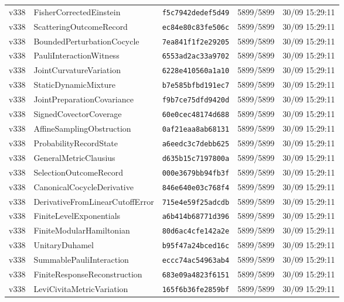 \documentclass[11pt]{article}
\theoremstyle{definition}\newtheorem{deriv}{Derivação}
\begin{document}
{\begin{longtable}{@{}lllll@{}}
v338 & FisherCorrectedEinstein & \texttt{f5c7942dedef5d49} & 5899/5899 & 30/09 15:29:11 \\
v338 & ScatteringOutcomeRecord & \texttt{ec84e80c83fe506c} & 5899/5899 & 30/09 15:29:11 \\
v338 & BoundedPerturbationCocycle & \texttt{7ea841f1f2e29205} & 5899/5899 & 30/09 15:29:11 \\
v338 & PauliInteractionWitness & \texttt{6553ad2ac33a9702} & 5899/5899 & 30/09 15:29:11 \\
v338 & JointCurvatureVariation & \texttt{6228e410560a1a10} & 5899/5899 & 30/09 15:29:11 \\
v338 & StaticDynamicMixture & \texttt{b7e585bfbd191ec7} & 5899/5899 & 30/09 15:29:11 \\
v338 & JointPreparationCovariance & \texttt{f9b7ce75dfd9420d} & 5899/5899 & 30/09 15:29:11 \\
v338 & SignedCovectorCoverage & \texttt{60e0cec48174d688} & 5899/5899 & 30/09 15:29:11 \\
v338 & AffineSamplingObstruction & \texttt{0af21eaa8ab68131} & 5899/5899 & 30/09 15:29:11 \\
v338 & ProbabilityRecordState & \texttt{a6eedc3c7debb625} & 5899/5899 & 30/09 15:29:11 \\
v338 & GeneralMetricClausius & \texttt{d635b15c7197800a} & 5899/5899 & 30/09 15:29:11 \\
v338 & SelectionOutcomeRecord & \texttt{000e3679bb94fb3f} & 5899/5899 & 30/09 15:29:11 \\
v338 & CanonicalCocycleDerivative & \texttt{846e640e03c768f4} & 5899/5899 & 30/09 15:29:11 \\
v338 & DerivativeFromLinearCutoffError & \texttt{715e4e59f25adcdb} & 5899/5899 & 30/09 15:29:11 \\
v338 & FiniteLevelExponentials & \texttt{a6b414b68771d396} & 5899/5899 & 30/09 15:29:11 \\
v338 & FiniteModularHamiltonian & \texttt{80d6ac4cfe142a2e} & 5899/5899 & 30/09 15:29:11 \\
v338 & UnitaryDuhamel & \texttt{b95f47a24bced16c} & 5899/5899 & 30/09 15:29:11 \\
v338 & SummablePauliInteraction & \texttt{eccc74ac54963ab4} & 5899/5899 & 30/09 15:29:11 \\
v338 & FiniteResponseReconstruction & \texttt{683e09a4823f6151} & 5899/5899 & 30/09 15:29:11 \\
v338 & LeviCivitaMetricVariation & \texttt{165f6b36fe2859bf} & 5899/5899 & 30/09 15:29:11 \\

\end{longtable}}
\end{document}
